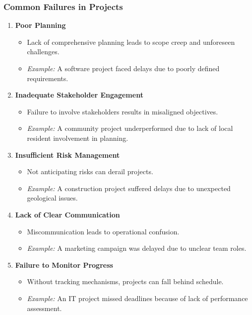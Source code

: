 \documentclass[aspectratio=169]{beamer}
\begin{document}
\begin{frame}[fragile]
    \frametitle{Common Failures in Projects}
    \begin{enumerate}
        \item \textbf{Poor Planning}
            \begin{itemize}
                \item Lack of comprehensive planning leads to scope creep and unforeseen challenges.
                \item \textit{Example:} A software project faced delays due to poorly defined requirements.
            \end{itemize}
        
        \item \textbf{Inadequate Stakeholder Engagement}
            \begin{itemize}
                \item Failure to involve stakeholders results in misaligned objectives.
                \item \textit{Example:} A community project underperformed due to lack of local resident involvement in planning.
            \end{itemize}
        
        \item \textbf{Insufficient Risk Management}
            \begin{itemize}
                \item Not anticipating risks can derail projects.
                \item \textit{Example:} A construction project suffered delays due to unexpected geological issues.
            \end{itemize}
        
        \item \textbf{Lack of Clear Communication}
            \begin{itemize}
                \item Miscommunication leads to operational confusion.
                \item \textit{Example:} A marketing campaign was delayed due to unclear team roles.
            \end{itemize}
        
        \item \textbf{Failure to Monitor Progress}
            \begin{itemize}
                \item Without tracking mechanisms, projects can fall behind schedule.
                \item \textit{Example:} An IT project missed deadlines because of lack of performance assessment.
            \end{itemize}
    \end{enumerate}
\end{frame}
\end{document}
